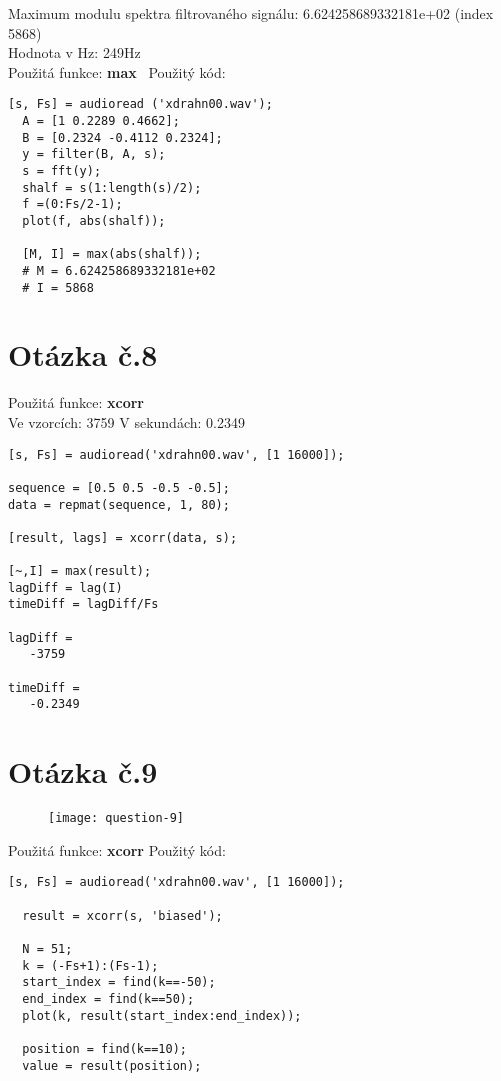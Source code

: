 \documentclass[a4paper,11pt]{article}
\begin{document}
Maximum modulu spektra filtrovaného signálu: 6.624258689332181e+02 (index 5868)\\
Hodnota v Hz: 249Hz\\
\newline
Použitá funkce: \textbf{max}\
\newline
\newline
Použitý kód:
\lstset{language=Matlab}
\begin{lstlisting}[frame=single,breaklines]
  [s, Fs] = audioread ('xdrahn00.wav');
  A = [1 0.2289 0.4662];
  B = [0.2324 -0.4112 0.2324];
  y = filter(B, A, s);
  s = fft(y);
  shalf = s(1:length(s)/2);
  f =(0:Fs/2-1);
  plot(f, abs(shalf));

  [M, I] = max(abs(shalf));
  # M = 6.624258689332181e+02
  # I = 5868
\end{lstlisting}

\section{Otázka č.8}

Použitá funkce: \textbf{xcorr}\\
\newline
Ve vzorcích: 3759
\newline
V sekundách: 0.2349
\newline

\lstset{language=Matlab}
\begin{lstlisting}[frame=single,breaklines]
[s, Fs] = audioread('xdrahn00.wav', [1 16000]);

sequence = [0.5 0.5 -0.5 -0.5];
data = repmat(sequence, 1, 80);

[result, lags] = xcorr(data, s);

[~,I] = max(result);
lagDiff = lag(I)
timeDiff = lagDiff/Fs

lagDiff =
   -3759

timeDiff =
   -0.2349

\end{lstlisting}

\section{Otázka č.9}

\begin{figure}[H]
  \centering
  \texttt{[image: question-9]}
\end{figure}

Použitá funkce: \textbf{xcorr}
\newline
\newline
Použitý kód:
\lstset{language=Matlab}
\begin{lstlisting}[frame=single,breaklines]
  [s, Fs] = audioread('xdrahn00.wav', [1 16000]);

  result = xcorr(s, 'biased');

  N = 51;
  k = (-Fs+1):(Fs-1);
  start_index = find(k==-50);
  end_index = find(k==50);
  plot(k, result(start_index:end_index));

  position = find(k==10);
  value = result(position);
\end{lstlisting}
\end{document}
